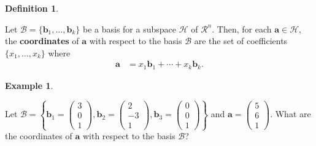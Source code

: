 \documentclass[
]{book}
\theoremstyle{definition}
\newtheorem{definition}{Definition}[chapter]
\theoremstyle{definition}
\newtheorem{example}{Example}[chapter]
\theoremstyle{definition}
\theoremstyle{remark}
\begin{document}
\begin{definition}
\protect\hypertarget{def:coordinates}{}\label{def:coordinates}

Let \(\mathcal{B} = \{ \mathbf{b}_1, \ldots, \mathbf{b}_k\}\) be a basis for a subspace \(\mathcal{H}\) of \(\mathcal{R}^n\). Then, for each \(\mathbf{a} \in \mathcal{H}\), the \textbf{coordinates} of \(\mathbf{a}\) with respect to the basis \(\mathcal{B}\) are the set of coefficients \(\{x_1, \ldots, x_k\}\) where
\[
\begin{aligned}
\mathbf{a} & = x_1 \mathbf{b}_1 + \cdots + x_k \mathbf{b}_k.
\end{aligned}
\]

\end{definition}

\begin{example}
\protect\hypertarget{exm:unlabeled-div-95}{}\label{exm:unlabeled-div-95}

Let \(\mathcal{B} = \left\{ \mathbf{b}_1 = \begin{pmatrix} 3 \\ 0 \\ 1 \end{pmatrix}, \mathbf{b}_2 = \begin{pmatrix} 2 \\ -3 \\ 1 \end{pmatrix}, \mathbf{b}_3 = \begin{pmatrix} 0 \\ 0 \\ 1 \end{pmatrix} \right\}\) and \(\mathbf{a} = \begin{pmatrix} 5 \\ 6 \\ 1 \end{pmatrix}\). What are the coordinates of \(\mathbf{a}\) with respect to the basis \(\mathcal{B}\)?

\end{example}
\end{document}
